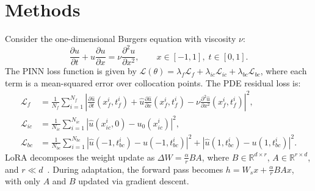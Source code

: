 \section{Methods}
\label{sec:methods}

Consider the one-dimensional Burgers equation with viscosity $\nu$:
\begin{equation}
\label{eq:burgers}
\frac{\partial u}{\partial t} + u \frac{\partial u}{\partial x} = \nu \frac{\partial^2 u}{\partial x^2}, \qquad x \in [-1, 1],\; t \in [0, 1].
\end{equation}
The PINN loss function is given by $\mathcal{L}(\theta)
= \lambda_f \mathcal{L}_f + \lambda_{ic} \mathcal{L}_{ic} + \lambda_{bc}
\mathcal{L}_{bc}$,
where each term is a mean-squared error over collocation points.
The PDE residual loss is:
\begin{align}
\mathcal{L}_f &= \frac{1}{N_f} \sum_{i=1}^{N_f} \left| \frac{\partial \hat{u}}{\partial t}(x_f^i, t_f^i) + \hat{u} \frac{\partial \hat{u}}{\partial x}(x_f^i, t_f^i) - \nu \frac{\partial^2 \hat{u}}{\partial x^2}(x_f^i, t_f^i) \right|^2, \\
\mathcal{L}_{ic} &= \frac{1}{N_{ic}} \sum_{i=1}^{N_{ic}} \left| \hat{u}(x_{ic}^i, 0) - u_0(x_{ic}^i) \right|^2, \\
\mathcal{L}_{bc} &= \frac{1}{N_{bc}} \sum_{i=1}^{N_{bc}} \left| \hat{u}(-1, t_{bc}^i) - u(-1, t_{bc}^i) \right|^2 + \left| \hat{u}(1, t_{bc}^i) - u(1, t_{bc}^i) \right|^2.
\end{align}
LoRA decomposes the weight update as $\Delta W = \frac{\alpha}{r} B A$,
where $B \in \mathbb{R}^{d \times r}$, $A \in \mathbb{R}^{r \times d}$,
and $r \ll d$~\cite{hu2022lora}.
During adaptation, the forward pass becomes $h = W_s x + \frac{\alpha}{r} B A
x$,
with only $A$ and $B$ updated via gradient descent.
